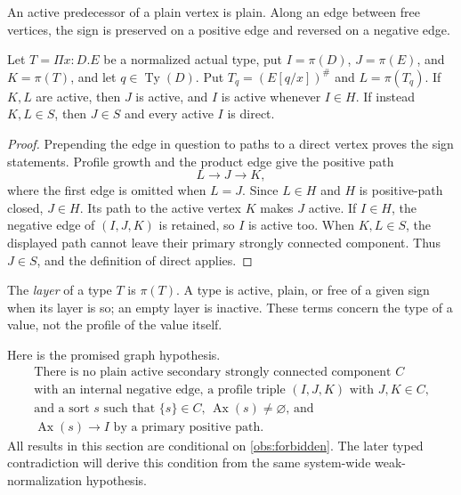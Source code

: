 \begin{lemma}\label{obs:graph-lemma}
An active predecessor of a plain vertex is plain.  Along an edge between
free vertices, the sign is preserved on a positive edge and reversed on
a negative edge.

Let $T=\Pi x:D.E$ be a normalized actual type, put
$I=\pi(D)$, $J=\pi(E)$, and $K=\pi(T)$, and let
$q\in\operatorname{Ty}(D)$.  Put $T_q=(E[q/x])^\#$ and $L=\pi(T_q)$.
If $K,L$ are active, then $J$ is active, and $I$ is active whenever
$I\in H$.  If instead $K,L\in S$, then $J\in S$ and every active $I$
is direct.
\end{lemma}
\begin{proof}
Prepending the edge in question to paths to a direct vertex proves the
sign statements.  Profile growth and the product edge give the positive
path
\[
                         L\longrightarrow J\longrightarrow K,
\]
where the first edge is omitted when $L=J$.  Since $L\in H$ and $H$ is
positive-path closed, $J\in H$.  Its path to the active vertex $K$ makes
$J$ active.  If $I\in H$, the negative edge of $(I,J,K)$ is retained,
so $I$ is active too.  When $K,L\in S$, the displayed path cannot leave
their primary strongly connected component.  Thus $J\in S$, and the
definition of direct applies.
\end{proof}

The \emph{layer} of a type $T$ is $\pi(T)$.  A type is active, plain, or
free of a given sign when its layer is so; an empty layer is inactive.
These terms concern the type of a value, not the profile of the value
itself.

Here is the promised graph hypothesis.
\begin{equation}\label{obs:forbidden}
\begin{gathered}
\text{There is no plain active secondary strongly connected component $C$}\\[-2pt]
\text{with an internal negative edge, a profile triple $(I,J,K)$ with $J,K\in C$,}\\[-2pt]
\text{and a sort $s$ such that $\{s\}\in C$, $\operatorname{Ax}(s)\ne\varnothing$, and}\\[-2pt]
                  \operatorname{Ax}(s)\longrightarrow I
                  \text{ by a primary positive path.}
\end{gathered}
\end{equation}
All results in this section are conditional on
\eqref{obs:forbidden}.  The later typed contradiction will derive this
condition from the same system-wide weak-normalization hypothesis.

